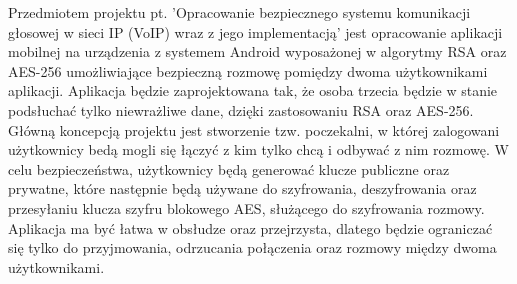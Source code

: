 \tab

Przedmiotem projektu pt. 'Opracowanie bezpiecznego systemu komunikacji głosowej w sieci IP (VoIP) wraz z jego implementacją' jest opracowanie aplikacji mobilnej na urządzenia z systemem Android wyposażonej w algorytmy RSA oraz AES-256 umożliwiające bezpieczną rozmowę pomiędzy dwoma użytkownikami aplikacji. Aplikacja będzie zaprojektowana tak, że osoba trzecia będzie w stanie podsłuchać tylko niewrażliwe dane, dzięki zastosowaniu RSA oraz AES-256. Główną koncepcją projektu jest stworzenie tzw. poczekalni, w której zalogowani użytkownicy bedą mogli się łączyć z kim tylko chcą i odbywać z nim rozmowę. W celu bezpieczeństwa, użytkownicy będą generować klucze publiczne oraz prywatne, które następnie będą używane do szyfrowania, deszyfrowania oraz przesyłaniu klucza szyfru blokowego AES, służącego do szyfrowania rozmowy. Aplikacja ma być łatwa w obsłudze oraz przejrzysta, dlatego będzie ograniczać się tylko do przyjmowania, odrzucania połączenia oraz rozmowy między dwoma użytkownikami.
